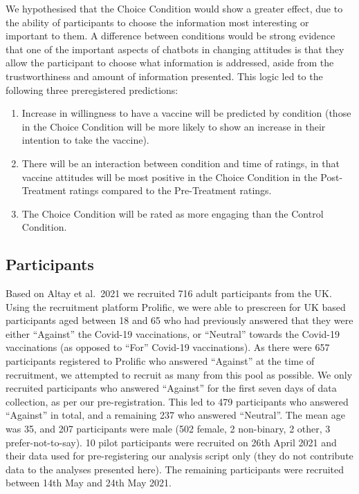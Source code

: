 \documentclass[
  english,
  ,jou,floatsintext]{apa6}
\providecommand{\tightlist}{%
  \setlength{\itemsep}{0pt}\setlength{\parskip}{0pt}}
\begin{document}
We hypothesised that the Choice Condition would show a greater effect, due to the ability of participants to choose the information most interesting or important to them. A difference between conditions would be strong evidence that one of the important aspects of chatbots in changing attitudes is that they allow the participant to choose what information is addressed, aside from the trustworthiness and amount of information presented. This logic led to the following three preregistered predictions:

\begin{enumerate}
\def\labelenumi{\arabic{enumi})}
\tightlist
\item
  Increase in willingness to have a vaccine will be predicted by condition (those in the Choice Condition will be more likely to show an increase in their intention to take the vaccine).
\item
  There will be an interaction between condition and time of ratings, in that vaccine attitudes will be most positive in the Choice Condition in the Post-Treatment ratings compared to the Pre-Treatment ratings.
\item
  The Choice Condition will be rated as more engaging than the Control Condition.
\end{enumerate}

\hypertarget{participants}{%
\subsection{Participants}\label{participants}}

Based on Altay et al.~2021 we recruited 716 adult participants from the UK. Using the recruitment platform Prolific, we were able to prescreen for UK based participants aged between 18 and 65 who had previously answered that they were either ``Against'' the Covid-19 vaccinations, or ``Neutral'' towards the Covid-19 vaccinations (as opposed to ``For'' Covid-19 vaccinations). As there were 657 participants registered to Prolific who answered ``Against'' at the time of recruitment, we attempted to recruit as many from this pool as possible. We only recruited participants who answered ``Against'' for the first seven days of data collection, as per our pre-registration. This led to 479 participants who answered ``Against'' in total, and a remaining 237 who answered ``Neutral''. The mean age was 35, and 207 participants were male (502 female, 2 non-binary, 2 other, 3 prefer-not-to-say). 10 pilot participants were recruited on 26th April 2021 and their data used for pre-registering our analysis script only (they do not contribute data to the analyses presented here). The remaining participants were recruited between 14th May and 24th May 2021.
\end{document}
